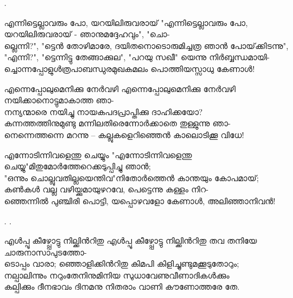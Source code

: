 \begin{enumerate}

.

\begin{slokam}{\VSr}{\VKG}{എന്നിട്ടെല്ലാവരും പോ, യറയിലിരുവരായ്‌}
"എന്നിട്ടെല്ലാവരും പോ, യറയിലിരുവരായ്‌ - ഞാനുമദ്ദേഹവും", "ചൊ-\\
ല്ലെന്നി?", "ട്ടെൻ തോഴിമാരേ, ദയിതനൊടൊരുമിച്ചത്ര ഞാൻ പോയ്‌ക്കിടന്നു",\\
"എന്നി?", "ട്ടെന്നിട്ടു തേങ്ങാക്കുല", "പറയു സഖീ" യെന്നു നിർബ്ബന്ധമായി-\\
ച്ചൊന്നപ്പോളുള്‍ത്രപാബന്ധുരമുഖകമലം പൊത്തിയസ്സാധു കേണാള്‍!
\end{slokam}


\begin{slokam}{\VSv}{\CKP}{എന്നെപ്പോലുമെനിക്കു നേർവഴി}
എന്നെപ്പോലുമെനിക്കു നേർവഴി നയിക്കാനൊട്ടുമാകാത്ത ഞാ-\\
നന്യന്മാരെ നയിച്ചു നായകപദപ്രാപ്തിക്കു ദാഹിക്കയോ?\\
കന്നത്തത്തിനുമുണ്ടു മന്നിലതിരെന്നോർക്കാതെ തുള്ളുന്നു ഞാ-\\
നെന്നെത്തന്നെ മറന്നു -- കല്ലുകളെറിഞ്ഞെൻ കാലൊടിക്കൂ വിധേ!
\end{slokam}



\begin{slokam}{\VSv}{\UN}{എന്നോടിന്നിവളെന്തു ചെയ്യും}
  "എന്നോടിന്നിവളെന്തു ചെയ്യു"മിതുമോർത്തേറെക്കടുപ്പിച്ചു ഞാൻ; \\
  "ഒന്നും ചൊല്ലുവതില്ലയെന്തിവ"നിതോർത്തെൻ കാന്തയും കോപമായ്;\\
  കൺകൾ വല്ല വഴിയ്ക്കുമായുഴറവേ, പെട്ടെന്നു   കള്ളം നിറ- \\
  ഞ്ഞെന്നിൽ പുഞ്ചിരി പൊട്ടി, യപ്പൊഴവളോ കേണാൾ, അലിഞ്ഞാനിവൻ!
\end{slokam}
  

. .


\begin{slokam}{\VSr}{\Unk}{എൾപ്പൂ കീഴ്പ്പോട്ടു നില്ക്കിൻറിതു}
എൾപ്പൂ കീഴ്പ്പോട്ടു നില്ക്കിൻറിതു തവ തനിയേ ചാരുനാസാപുടത്തോ-\\
ടൊപ്പം വാരാ; ഞ്ഞൊളിക്കിൻറിതു കിമപി കിളിച്ചുണ്ടുമക്കൂടുതോറും;\\
നല്പാലിന്നും നറുംതേനിനുമിനിയ സുധാവേണുവീണാദികൾക്കും\\
കല്പിക്കും ദീനഭാവം ദിനമനു നിതരാം വാണി കൗണോത്തരേ തേ.
\end{slokam}



\end{enumerate}
